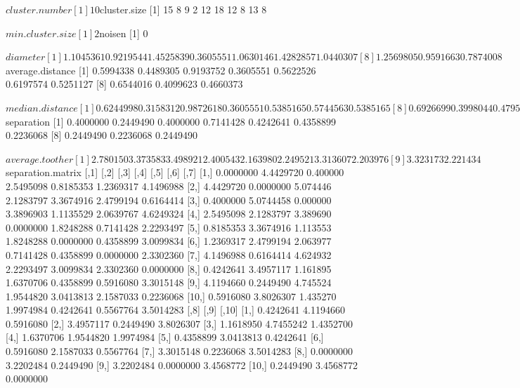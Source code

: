 \documentclass{article}
\begin{document}
\begin{Schunk}
\begin{Soutput}
$cluster.number
[1] 10

$cluster.size
 [1] 15  8  9  2 12 18 12  8 13  8

$min.cluster.size
[1] 2

$noisen
[1] 0

$diameter
 [1] 1.1045361 0.9219544 1.4525839 0.3605551 1.0630146 1.4282857 1.0440307
 [8] 1.2569805 0.9591663 0.7874008

$average.distance
 [1] 0.5994338 0.4489305 0.9193752 0.3605551 0.5622526 0.6197574 0.5251127
 [8] 0.6544016 0.4099623 0.4660373

$median.distance
 [1] 0.6244998 0.3158312 0.9872618 0.3605551 0.5385165 0.5744563 0.5385165
 [8] 0.6926699 0.3998044 0.4795832

$separation
 [1] 0.4000000 0.2449490 0.4000000 0.7141428 0.4242641 0.4358899 0.2236068
 [8] 0.2449490 0.2236068 0.2449490

$average.toother
 [1] 2.780150 3.373583 3.498921 2.400543 2.163980 2.249521 3.313607 2.203976
 [9] 3.323173 2.221434

$separation.matrix
           [,1]      [,2]     [,3]      [,4]      [,5]      [,6]      [,7]
 [1,] 0.0000000 4.4429720 0.400000 2.5495098 0.8185353 1.2369317 4.1496988
 [2,] 4.4429720 0.0000000 5.074446 2.1283797 3.3674916 2.4799194 0.6164414
 [3,] 0.4000000 5.0744458 0.000000 3.3896903 1.1135529 2.0639767 4.6249324
 [4,] 2.5495098 2.1283797 3.389690 0.0000000 1.8248288 0.7141428 2.2293497
 [5,] 0.8185353 3.3674916 1.113553 1.8248288 0.0000000 0.4358899 3.0099834
 [6,] 1.2369317 2.4799194 2.063977 0.7141428 0.4358899 0.0000000 2.3302360
 [7,] 4.1496988 0.6164414 4.624932 2.2293497 3.0099834 2.3302360 0.0000000
 [8,] 0.4242641 3.4957117 1.161895 1.6370706 0.4358899 0.5916080 3.3015148
 [9,] 4.1194660 0.2449490 4.745524 1.9544820 3.0413813 2.1587033 0.2236068
[10,] 0.5916080 3.8026307 1.435270 1.9974984 0.4242641 0.5567764 3.5014283
           [,8]      [,9]     [,10]
 [1,] 0.4242641 4.1194660 0.5916080
 [2,] 3.4957117 0.2449490 3.8026307
 [3,] 1.1618950 4.7455242 1.4352700
 [4,] 1.6370706 1.9544820 1.9974984
 [5,] 0.4358899 3.0413813 0.4242641
 [6,] 0.5916080 2.1587033 0.5567764
 [7,] 3.3015148 0.2236068 3.5014283
 [8,] 0.0000000 3.2202484 0.2449490
 [9,] 3.2202484 0.0000000 3.4568772
[10,] 0.2449490 3.4568772 0.0000000


\end{Soutput}
\end{Schunk}
\end{document}
